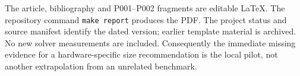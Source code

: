 The article, bibliography and P001--P002 fragments are editable LaTeX. The repository
command \texttt{make report} produces the PDF. The project status and source
manifest identify the dated version; earlier template material is archived.
No new solver measurements are included. Consequently the immediate missing
evidence for a hardware-specific size recommendation is the local pilot,
not another extrapolation from an unrelated benchmark.
